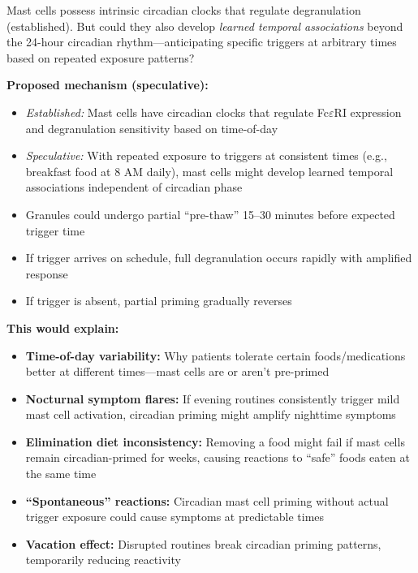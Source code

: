 \begin{open_question}
Mast cells possess intrinsic circadian clocks that regulate degranulation (established). But could they also develop \textit{learned temporal associations} beyond the 24-hour circadian rhythm---anticipating specific triggers at arbitrary times based on repeated exposure patterns?

\textbf{Proposed mechanism (speculative):}
\begin{itemize}
    \item \textit{Established:} Mast cells have circadian clocks that regulate Fc$\varepsilon$RI expression and degranulation sensitivity based on time-of-day
    \item \textit{Speculative:} With repeated exposure to triggers at consistent times (e.g., breakfast food at 8 AM daily), mast cells might develop learned temporal associations independent of circadian phase
    \item Granules could undergo partial ``pre-thaw'' 15--30 minutes before expected trigger time
    \item If trigger arrives on schedule, full degranulation occurs rapidly with amplified response
    \item If trigger is absent, partial priming gradually reverses
\end{itemize}

\textbf{This would explain:}
\begin{itemize}
    \item \textbf{Time-of-day variability:} Why patients tolerate certain foods/medications better at different times---mast cells are or aren't pre-primed
    \item \textbf{Nocturnal symptom flares:} If evening routines consistently trigger mild mast cell activation, circadian priming might amplify nighttime symptoms
    \item \textbf{Elimination diet inconsistency:} Removing a food might fail if mast cells remain circadian-primed for weeks, causing reactions to ``safe'' foods eaten at the same time
    \item \textbf{``Spontaneous'' reactions:} Circadian mast cell priming without actual trigger exposure could cause symptoms at predictable times
    \item \textbf{Vacation effect:} Disrupted routines break circadian priming patterns, temporarily reducing reactivity
\end{itemize}


\end{open_question}
